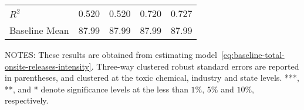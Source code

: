 \begin{table}[H]
{\begin{tabular}{@{}lllll@{}}
            $R^2$                          & 0.520     & 0.520     & 0.720     & 0.727     \\
            Baseline Mean                  & 87.99     & 87.99     & 87.99     & 87.99     \\ \bottomrule\bottomrule
        \end{tabular}%
    }
    \begin{minipage}{\columnwidth}
        \vspace{0.05in}
        \tiny NOTES: These results are obtained from estimating model~\ref{eq:baseline-total-onsite-releases-intensity}. Three-way clustered robust standard errors are reported in parentheses, and clustered at the toxic chemical, industry and state levels. ***, **, and * denote significance levels at the less than $1\%$, $5\%$ and $10\%$, respectively.
    \end{minipage}
\end{table}